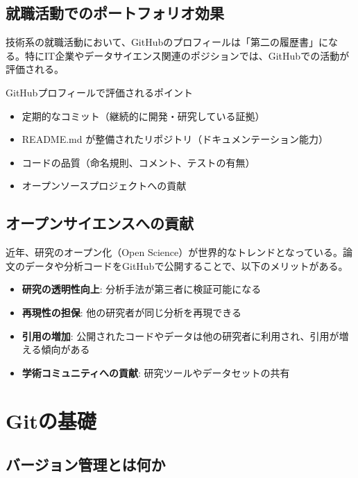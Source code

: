 \subsection{就職活動でのポートフォリオ効果}

技術系の就職活動において、GitHubのプロフィールは「第二の履歴書」になる。特にIT企業やデータサイエンス関連のポジションでは、GitHubでの活動が評価される。

\begin{itembox}[l]{GitHubプロフィールで評価されるポイント}
\begin{itemize}
\item 定期的なコミット（継続的に開発・研究している証拠）
\item README.md が整備されたリポジトリ（ドキュメンテーション能力）
\item コードの品質（命名規則、コメント、テストの有無）
\item オープンソースプロジェクトへの貢献
\end{itemize}
\end{itembox}

\subsection{オープンサイエンスへの貢献}

近年、研究のオープン化（Open Science）が世界的なトレンドとなっている。論文のデータや分析コードをGitHubで公開することで、以下のメリットがある。

\begin{itemize}
\item \textbf{研究の透明性向上}: 分析手法が第三者に検証可能になる
\item \textbf{再現性の担保}: 他の研究者が同じ分析を再現できる
\item \textbf{引用の増加}: 公開されたコードやデータは他の研究者に利用され、引用が増える傾向がある
\item \textbf{学術コミュニティへの貢献}: 研究ツールやデータセットの共有
\end{itemize}

\section{Gitの基礎}

\subsection{バージョン管理とは何か}

